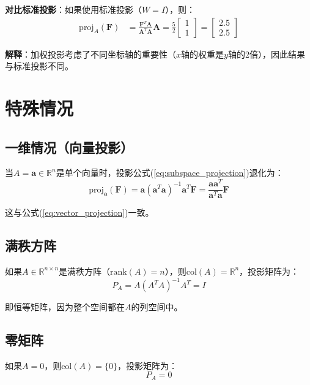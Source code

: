 \documentclass[12pt,a4paper]{article}
\begin{document}
\textbf{对比标准投影}：如果使用标准投影（$W = I$），则：
\begin{align}
\text{proj}_{A}(\bm{F}) &= \frac{\bm{F}^T \bm{A}}{\bm{A}^T \bm{A}} \bm{A} = \frac{5}{2} \begin{bmatrix} 1 \\ 1 \end{bmatrix} = \begin{bmatrix} 2.5 \\ 2.5 \end{bmatrix}
\end{align}

\textbf{解释}：加权投影考虑了不同坐标轴的重要性（$x$轴的权重是$y$轴的2倍），因此结果与标准投影不同。

\section{特殊情况}

\subsection{一维情况（向量投影）}

当$A = \bm{a} \in \mathbb{R}^n$是单个向量时，投影公式(\ref{eq:subspace_projection})退化为：
\begin{equation}
\text{proj}_{\bm{a}}(\bm{F}) = \bm{a} (\bm{a}^T \bm{a})^{-1} \bm{a}^T \bm{F} = \frac{\bm{a} \bm{a}^T}{\bm{a}^T \bm{a}} \bm{F}
\end{equation}

这与公式(\ref{eq:vector_projection})一致。

\subsection{满秩方阵}

如果$A \in \mathbb{R}^{n \times n}$是满秩方阵（$\text{rank}(A) = n$），则$\text{col}(A) = \mathbb{R}^n$，投影矩阵为：
\begin{equation}
P_A = A (A^T A)^{-1} A^T = I
\end{equation}

即恒等矩阵，因为整个空间都在$A$的列空间中。

\subsection{零矩阵}

如果$A = 0$，则$\text{col}(A) = \{0\}$，投影矩阵为：
\begin{equation}
P_A = 0
\end{equation}
\end{document}
